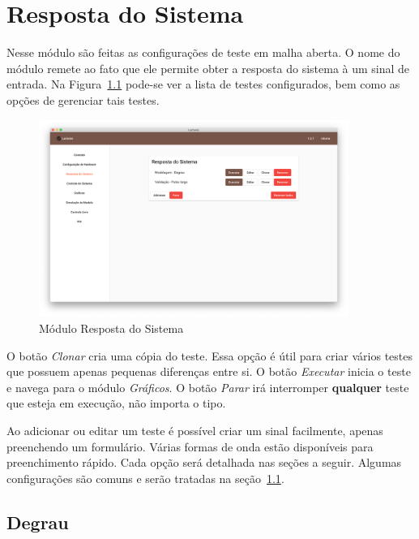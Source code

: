 
\chapter{Resposta do Sistema}%
\label{chapter:system-response}

Nesse módulo são feitas as configurações de teste em malha aberta. O nome do
módulo remete ao fato que ele permite obter a resposta do sistema à um sinal de
entrada. Na Figura~\ref{fig:system-response1} pode-se ver a lista de testes
configurados, bem como as opções de gerenciar tais testes.

\begin{figure}[ht!]
    \centering
    \includegraphics[width=0.9\textwidth]{imgs/system-response1}
    \caption[Módulo Resposta do Sistema]{Módulo Resposta do Sistema}%
    \label{fig:system-response1}
\end{figure}

O botão \textit{Clonar} cria uma cópia do teste. Essa opção é útil para criar
vários testes que possuem apenas pequenas diferenças entre si. O botão
\textit{Executar} inicia o teste e navega para o módulo \textit{Gráficos}. O
botão \textit{Parar} irá interromper \textbf{qualquer} teste que esteja em
execução, não importa o tipo.

Ao adicionar ou editar um teste é possível criar um sinal facilmente, apenas
preenchendo um formulário. Várias formas de onda estão disponíveis para
preenchimento rápido. Cada opção será detalhada nas seções a seguir. Algumas
configurações são comuns e serão tratadas na seção~\ref{sec:step}.

\section{Degrau}%
\label{sec:step}

